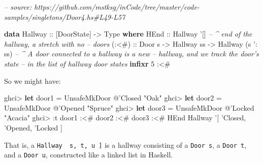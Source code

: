 \documentclass[]{article}
\newenvironment{Shaded}{}{}
\newcommand{\CommentTok}[1]{\textcolor[rgb]{0.38,0.63,0.69}{\textit{#1}}}
\newcommand{\DataTypeTok}[1]{\textcolor[rgb]{0.56,0.13,0.00}{#1}}
\newcommand{\DecValTok}[1]{\textcolor[rgb]{0.25,0.63,0.44}{#1}}
\newcommand{\FunctionTok}[1]{\textcolor[rgb]{0.02,0.16,0.49}{#1}}
\newcommand{\KeywordTok}[1]{\textcolor[rgb]{0.00,0.44,0.13}{\textbf{#1}}}
\newcommand{\NormalTok}[1]{#1}
\newcommand{\OtherTok}[1]{\textcolor[rgb]{0.00,0.44,0.13}{#1}}
\newcommand{\StringTok}[1]{\textcolor[rgb]{0.25,0.44,0.63}{#1}}
\begin{document}
\begin{Shaded}
\begin{Highlighting}[]
\CommentTok{-- source: https://github.com/mstksg/inCode/tree/master/code-samples/singletons/Door4.hs#L49-L57}

\KeywordTok{data} \DataTypeTok{Hallway}\OtherTok{ ::}\NormalTok{ [}\DataTypeTok{DoorState}\NormalTok{] }\OtherTok{->} \DataTypeTok{Type} \KeywordTok{where}
    \DataTypeTok{HEnd}\OtherTok{  ::} \DataTypeTok{Hallway}\NormalTok{ '[]        }\CommentTok{-- ^ end of the hallway, a stretch with no}
                                \CommentTok{--   doors}
\OtherTok{    (:<#) ::} \DataTypeTok{Door}\NormalTok{ s}
          \OtherTok{->} \DataTypeTok{Hallway}\NormalTok{ ss}
          \OtherTok{->} \DataTypeTok{Hallway}\NormalTok{ (s '}\FunctionTok{:}\NormalTok{ ss)  }\CommentTok{-- ^ A door connected to a hallway is a new}
                                \CommentTok{--   hallway, and we track the door's state}
                                \CommentTok{--   in the list of hallway door states}
\KeywordTok{infixr} \DecValTok{5} \FunctionTok{:<#}
\end{Highlighting}
\end{Shaded}

So we might have:

\begin{Shaded}
\begin{Highlighting}[]
\NormalTok{ghci}\FunctionTok{>} \KeywordTok{let}\NormalTok{ door1 }\FunctionTok{=} \DataTypeTok{UnsafeMkDoor} \FunctionTok{@}\NormalTok{'}\DataTypeTok{Closed} \StringTok{"Oak"}
\NormalTok{ghci}\FunctionTok{>} \KeywordTok{let}\NormalTok{ door2 }\FunctionTok{=} \DataTypeTok{UnsafeMkDoor} \FunctionTok{@}\NormalTok{'}\DataTypeTok{Opened} \StringTok{"Spruce"}
\NormalTok{ghci}\FunctionTok{>} \KeywordTok{let}\NormalTok{ door3 }\FunctionTok{=} \DataTypeTok{UnsafeMkDoor} \FunctionTok{@}\NormalTok{'}\DataTypeTok{Locked} \StringTok{"Acacia"}
\NormalTok{ghci}\FunctionTok{>} \FunctionTok{:}\NormalTok{t door1 }\FunctionTok{:<#}\NormalTok{ door2 }\FunctionTok{:<#}\NormalTok{ door3 }\FunctionTok{:<#} \DataTypeTok{HEnd}
\DataTypeTok{Hallway}\NormalTok{ '[ '}\DataTypeTok{Closed}\NormalTok{, '}\DataTypeTok{Opened}\NormalTok{, '}\DataTypeTok{Locked}\NormalTok{ ]}
\end{Highlighting}
\end{Shaded}

That is, a \texttt{Hallway\ \textquotesingle{}{[}\ s,\ t,\ u\ {]}} is a hallway
consisting of a \texttt{Door\ s}, a \texttt{Door\ t}, and a \texttt{Door\ u},
constructed like a linked list in Haskell.
\end{document}
